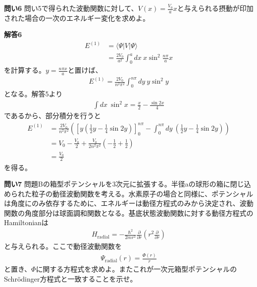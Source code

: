 \documentclass[11pt,pra,aps]{revtex4}
\begin{document}
\noindent
{\bf 問い6} 問い5で得られた波動関数に対して、$V(x)=\frac{V_0}{a}x$と与えられる摂動が印加された場合の一次のエネルギー変化を求めよ。

\noindent
{\bf 解答6}
\begin{align}
  E^{(1)}&=\langle\Psi|V|\Psi\rangle \nonumber \\
  &=\frac{2V_0}{a^2}\int_0^a dx \ x\sin^2\frac{n\pi}{a} x
\end{align}
を計算する。$y=\frac{n\pi x}{a}$と置けば、
\begin{align}
  E^{(1)}=\frac{2V_0}{n^2\pi^2}\int_0^{n\pi} dy \ y \sin^2 y
\end{align}
となる。解答5より
\begin{align}
  \int dx \ \sin^2 x = \frac{x}{2}-\frac{\sin2x}{4} 
\end{align}
であるから、部分積分を行うと
\begin{align}
  E^{(1)}&=\frac{2V_0}{n^2\pi^2}\left(\left[y\left(\frac{1}{2}y-\frac{1}{4}\sin2y\right)\right]^{n\pi}_0-\int^{n\pi}_0 dy \ \left(\frac{1}{2}y-\frac{1}{4}\sin2y\right) \right) \nonumber \\
  &=V_0 - \frac{V_0}{2}+\frac{V_0}{2n^2\pi^2}\left(-\frac{1}{2}+\frac{1}{2}\right) \nonumber \\
  &=\frac{V_0}{2}
\end{align}
を得る。

\noindent
{\bf 問い7} 問題Bの箱型ポテンシャルを3次元に拡張する。半径aの球形の箱に閉じ込められた粒子の動径波動関数を考える。水素原子の場合と同様に、ポテンシャルは角度にのみ依存するために、エネルギーは動径方程式のみから決定され、波動関数の角度部分は球面調和関数となる。基底状態波動関数に対する動径方程式のHamiltonianは
\begin{align}
  H_\text{radial}=-\frac{\hbar^2}{2mr^2}\frac{\partial}{\partial r}\left(r^2 \frac{\partial}{\partial r}\right) \label{eq:freep}
\end{align}    
と与えられる。ここで動径波動関数を
\begin{align}
  \Psi_\text{radial}(r)=\frac{\Phi(r)}{r}
\end{align}
と置き、$\Phi$に関する方程式を求めよ。またこれが一次元箱型ポテンシャルのSchr\"odinger方程式と一致することを示せ。
\end{document}
